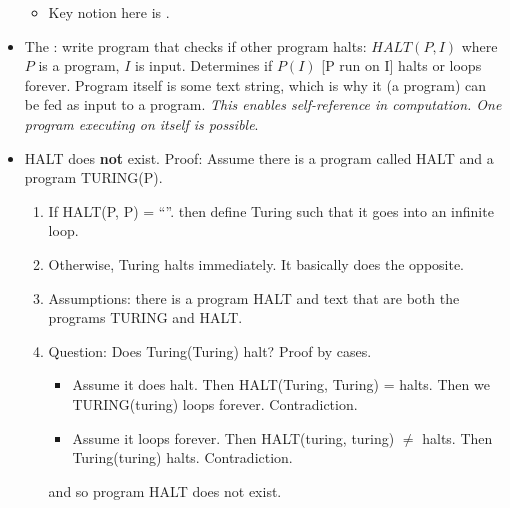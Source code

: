 \documentclass[12pt]{article}
\begin{document}
\begin{itemize}
\begin{itemize}
		\item Key notion here is . 
	\end{itemize}
	
	\item The : write program that checks if other program halts: $HALT(P, I)$ where $P$ is a program, $I$ is input. Determines if $P(I)$ [P run on I] halts or loops forever. Program itself is some text string, which is why it (a program) can be fed as input to a program. \textit{This enables self-reference in computation. One program executing on itself is possible}. 
	
	\item HALT does \textbf{not} exist. Proof: Assume there is a program called HALT and a program TURING(P). 
	\begin{enumerate}
		\item If HALT(P, P) = ``''. then define Turing such that it goes into an infinite loop. 
		\item Otherwise, Turing halts immediately. It basically does the opposite. 
		\item Assumptions: there is a program HALT and text that are both the programs TURING and HALT.
		\item Question: Does Turing(Turing) halt? Proof by cases. 
		\begin{itemize}
			\item Assume it does halt. Then HALT(Turing, Turing) = halts. Then we TURING(turing) loops forever. Contradiction. 
			\item Assume it loops forever. Then HALT(turing, turing) $\ne$ halts. Then Turing(turing) halts. Contradiction.
		\end{itemize}
		and so program HALT does not exist. 
	\end{enumerate}
\end{itemize}


\end{document}
